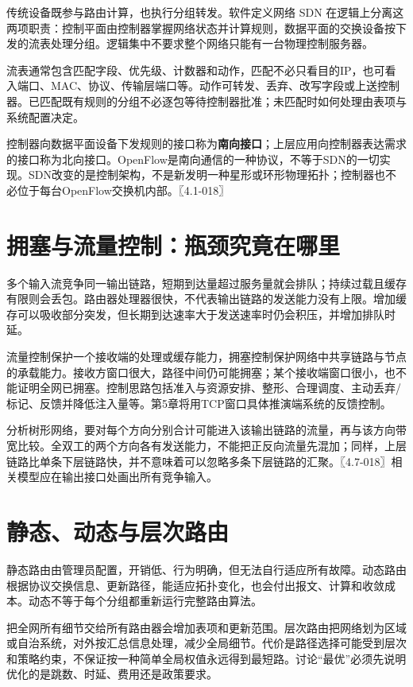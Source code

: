 传统设备既参与路由计算，也执行分组转发。软件定义网络 SDN 在逻辑上分离这两项职责：控制平面由控制器掌握网络状态并计算规则，数据平面的交换设备按下发的流表处理分组。逻辑集中不要求整个网络只能有一台物理控制服务器。

流表通常包含匹配字段、优先级、计数器和动作，匹配不必只看目的IP，也可看入端口、MAC、协议、传输层端口等。动作可转发、丢弃、改写字段或上送控制器。已匹配既有规则的分组不必逐包等待控制器批准；未匹配时如何处理由表项与系统配置决定。

控制器向数据平面设备下发规则的接口称为\textbf{南向接口}；上层应用向控制器表达需求的接口称为北向接口。OpenFlow是南向通信的一种协议，不等于SDN的一切实现。SDN改变的是控制架构，不是新发明一种星形或环形物理拓扑；控制器也不必位于每台OpenFlow交换机内部。〖4.1-018〗

\section{拥塞与流量控制：瓶颈究竟在哪里}\label{CN04-03}

多个输入流竞争同一输出链路，短期到达量超过服务量就会排队；持续过载且缓存有限则会丢包。路由器处理器很快，不代表输出链路的发送能力没有上限。增加缓存可以吸收部分突发，但长期到达速率大于发送速率时仍会积压，并增加排队时延。

流量控制保护一个接收端的处理或缓存能力，拥塞控制保护网络中共享链路与节点的承载能力。接收方窗口很大，路径中间仍可能拥塞；某个接收端窗口很小，也不能证明全网已拥塞。控制思路包括准入与资源安排、整形、合理调度、主动丢弃/标记、反馈并降低注入量等。第5章将用TCP窗口具体推演端系统的反馈控制。

分析树形网络，要对每个方向分别合计可能进入该输出链路的流量，再与该方向带宽比较。全双工的两个方向各有发送能力，不能把正反向流量先混加；同样，上层链路比单条下层链路快，并不意味着可以忽略多条下层链路的汇聚。〖4.7-018〗相关模型应在输出接口处画出所有竞争输入。

\section{静态、动态与层次路由}\label{CN04-04}

静态路由由管理员配置，开销低、行为明确，但无法自行适应所有故障。动态路由根据协议交换信息、更新路径，能适应拓扑变化，也会付出报文、计算和收敛成本。动态不等于每个分组都重新运行完整路由算法。

把全网所有细节交给所有路由器会增加表项和更新范围。层次路由把网络划为区域或自治系统，对外按汇总信息处理，减少全局细节。代价是路径选择可能受到层次和策略约束，不保证按一种简单全局权值永远得到最短路。讨论``最优''必须先说明优化的是跳数、时延、费用还是政策要求。

